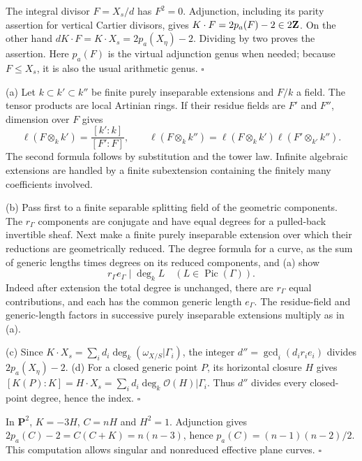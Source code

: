 \documentclass[11pt]{article}
\let\chapterexercise\exercise
\renewcommand{\exercise}[2]{\Needspace{8\baselineskip}\chapterexercise{#1}{#2}}
\begin{document}
\pf The integral divisor $F=X_s/d$ has $F^2=0$. Adjunction, including its parity assertion for vertical Cartier divisors, gives $K\cdot F=2p_a(F)-2\in2\mathbf Z$. On the other hand $dK\cdot F=K\cdot X_s=2p_a(X_\eta)-2$. Dividing by two proves the assertion. Here $p_a(F)$ is the virtual adjunction genus when needed; because $F\le X_s$, it is also the usual arithmetic genus. \hfill$\square$

\pf (a) Let $k\subset k'\subset k''$ be finite purely inseparable extensions and $F/k$ a field. The tensor products are local Artinian rings. If their residue fields are $F'$ and $F''$, dimension over $F$ gives
\[ \ell(F\otimes_k k')=\frac{[k':k]}{[F':F]},\qquad
\ell(F\otimes_k k'')=\ell(F\otimes_k k')\ell(F'\otimes_{k'}k''). \]
The second formula follows by substitution and the tower law. Infinite algebraic extensions are handled by a finite subextension containing the finitely many coefficients involved.

(b) Pass first to a finite separable splitting field of the geometric components. The $r_\Gamma$ components are conjugate and have equal degrees for a pulled-back invertible sheaf. Next make a finite purely inseparable extension over which their reductions are geometrically reduced. The degree formula for a curve, as the sum of generic lengths times degrees on its reduced components, and (a) show
\[ r_\Gamma e_\Gamma\mid\deg_k L \quad(L\in\operatorname{Pic}(\Gamma)). \]
Indeed after extension the total degree is unchanged, there are $r_\Gamma$ equal contributions, and each has the common generic length $e_\Gamma$. The residue-field and generic-length factors in successive purely inseparable extensions multiply as in (a).

(c) Since $K\cdot X_s=\sum_i d_i\deg_k(\omega_{X/S}|\Gamma_i)$, the integer $d''=\gcd_i(d_ir_i e_i)$ divides $2p_a(X_\eta)-2$. (d) For a closed generic point $P$, its horizontal closure $H$ gives $[K(P):K]=H\cdot X_s=\sum_i d_i\deg_k\mathcal O(H)|\Gamma_i$. Thus $d''$ divides every closed-point degree, hence the index. \hfill$\square$

\pf In $\mathbf P^2$, $K=-3H$, $C=nH$ and $H^2=1$. Adjunction gives $2p_a(C)-2=C(C+K)=n(n-3)$, hence $p_a(C)=(n-1)(n-2)/2$. This computation allows singular and nonreduced effective plane curves. \hfill$\square$
\end{document}
